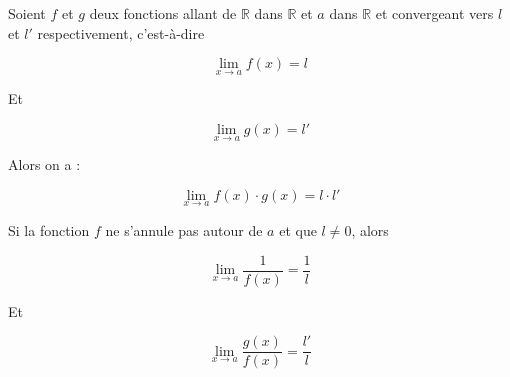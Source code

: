 \begin{boxthm}
Soient $f$ et $g$ deux fonctions allant de $\mathbb{R}$ dans $\mathbb{R}$ et $a$ dans $\mathbb{R}$ et convergeant vers $l$ et $l'$ respectivement, c'est-à-dire 

$$\lim\limits_{x \rightarrow a } f(x) = l$$


Et 


$$\lim\limits_{x \rightarrow a } g(x) = l'$$


Alors on a :

$$\lim\limits_{x \rightarrow a} f(x) \cdot g(x) =  l \cdot l'$$

Si la fonction $f$ ne s'annule pas autour de $a$ et que $l \ne 0$, alors 

$$\lim\limits_{x \rightarrow a} \frac{1}{f(x)} = \frac{1}{l}$$


Et 

$$\lim\limits_{x \rightarrow a} \frac{g(x)}{f(x)} =  \frac{l'}{l}$$

\end{boxthm}



